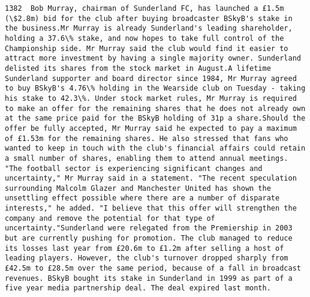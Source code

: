 \documentclass[11pt]{article}
\begin{document}
\begin{Verbatim}[commandchars=\\\{\}]
         1382  Bob Murray, chairman of Sunderland FC, has launched a £1.5m (\$2.8m) bid for the club after buying broadcaster BSkyB's stake in the business.Mr Murray is already Sunderland's leading shareholder, holding a 37.6\% stake, and now hopes to take full control of the Championship side. Mr Murray said the club would find it easier to attract more investment by having a single majority owner. Sunderland delisted its shares from the stock market in August.A lifetime Sunderland supporter and board director since 1984, Mr Murray agreed to buy BSkyB's 4.76\% holding in the Wearside club on Tuesday - taking his stake to 42.3\%. Under stock market rules, Mr Murray is required to make an offer for the remaining shares that he does not already own at the same price paid for the BSkyB holding of 31p a share.Should the offer be fully accepted, Mr Murray said he expected to pay a maximum of £1.53m for the remaining shares. He also stressed that fans who wanted to keep in touch with the club's financial affairs could retain a small number of shares, enabling them to attend annual meetings. "The football sector is experiencing significant changes and uncertainty," Mr Murray said in a statement. "The recent speculation surrounding Malcolm Glazer and Manchester United has shown the unsettling effect possible where there are a number of disparate interests," he added. "I believe that this offer will strengthen the company and remove the potential for that type of uncertainty."Sunderland were relegated from the Premiership in 2003 but are currently pushing for promotion. The club managed to reduce its losses last year from £20.6m to £1.2m after selling a host of leading players. However, the club's turnover dropped sharply from £42.5m to £28.5m over the same period, because of a fall in broadcast revenues. BSkyB bought its stake in Sunderland in 1999 as part of a five year media partnership deal. The deal expired last month.                                                                                                                                                                                                                                                                                                                                                                                                                                                                                                                                                                                                                                                                                                                                                                                                                                                                                                                                                                                                                                                                                                                                                                                                                                                                                                                                                                                                      
\end{Verbatim}
\end{document}

